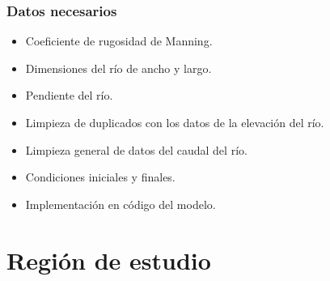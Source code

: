 \documentclass[17pt, t, lualatex]{beamer}
\begin{document}
\begin{frame}[allowframebreaks]
  \frametitle{Datos necesarios}

  \begin{itemize}
    \item Coeficiente de rugosidad de Manning\cite{garcia2020mathematical}. 
    \item Dimensiones del río de ancho y largo.
    \item Pendiente del río.  
    \item Limpieza de duplicados con los datos de la elevación del río.
    \item Limpieza general de datos del caudal del río.
    \item Condiciones iniciales y finales.
    \item Implementación en código del modelo.
  \end{itemize}

\end{frame}



\section{Región de estudio}

\insertsectionpage
\end{document}
